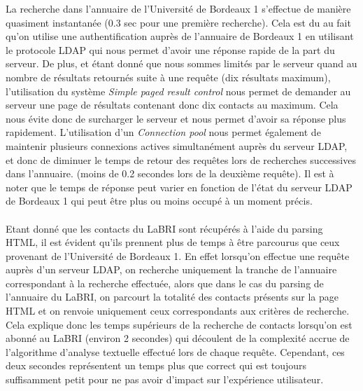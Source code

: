 La recherche dans l'annuaire de l'Université de Bordeaux 1 s'effectue de manière quasiment instantanée (0.3 sec pour une première recherche). Cela est du au fait qu'on utilise une authentification auprès de l'annuaire de Bordeaux 1 en utilisant le protocole LDAP qui nous permet d'avoir une réponse rapide de la part du serveur. De plus, et étant donné que nous sommes limités par le serveur quand au nombre de résultats retournés suite à une requête (dix résultats maximum), l'utilisation du système \emph{Simple paged result control} nous permet de demander au serveur une page de résultats contenant donc dix contacts au maximum. Cela nous évite donc de surcharger le serveur et nous permet d'avoir sa réponse plus rapidement. L'utilisation d'un \emph{Connection pool} nous permet également de maintenir plusieurs connexions actives simultanément auprès du serveur LDAP, et donc de diminuer le temps de retour des requêtes lors de recherches successives dans l'annuaire. (moins de 0.2 secondes lors de la deuxième requête). Il est à noter que le temps de réponse peut varier en fonction de l'état du serveur LDAP de Bordeaux 1 qui peut être plus ou moins occupé à un moment précis.\\\\

Etant donné que les contacts du LaBRI sont récupérés à l'aide du parsing HTML, il est évident qu'ils prennent plus de temps à être parcourus que ceux provenant de l'Université de Bordeaux 1. En effet lorsqu'on effectue une requête auprès d'un serveur LDAP, on recherche uniquement la tranche de l'annuaire correspondant à la recherche effectuée, alors que dans le cas du parsing de l'annuaire du LaBRI, on parcourt la totalité des contacts présents sur la page HTML et on renvoie uniquement ceux correspondants aux critères de recherche. Cela explique donc les temps supérieurs de la recherche de contacts lorsqu'on est abonné au LaBRI (environ 2 secondes) qui découlent de la complexité accrue de l'algorithme d'analyse textuelle effectué lors de chaque requête. Cependant, ces deux secondes représentent un temps plus que correct qui est toujours suffisamment petit pour ne pas avoir d'impact sur l'expérience utilisateur.


